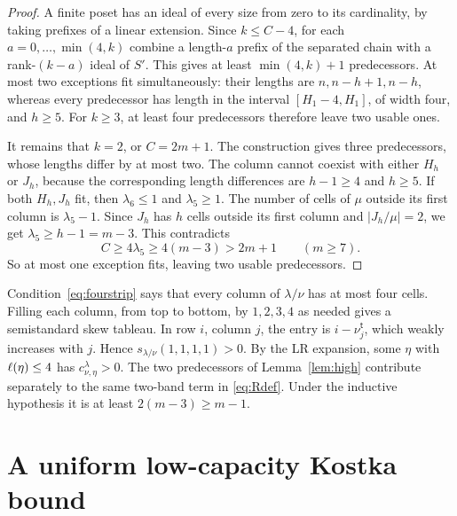 \documentclass[11pt]{article}
\theoremstyle{remark}\newtheorem{remark}[theorem]{Remark}
\newcommand{\trp}{\mathsf t}\newcommand{\eps}{\varepsilon}
\numberwithin{equation}{section}\setlength{\emergencystretch}{2em}
\begin{document}
\begin{proof}
A finite poset has an ideal of every size from zero to its cardinality,
by taking prefixes of a linear extension. Since $k\le C-4$, for each
$a=0,\ldots,\min(4,k)$ combine a length-$a$ prefix of the separated
chain with a rank-$(k-a)$ ideal of $S'$. This gives at least
$\min(4,k)+1$ predecessors. At most two exceptions fit simultaneously:
their lengths are $n,n-h+1,n-h$, whereas every predecessor has length
in the interval $[H_1-4,H_1]$, of width four, and $h\ge5$.
For $k\ge3$, at least four predecessors therefore leave two usable ones.

It remains that $k=2$, or $C=2m+1$. The construction gives three
predecessors, whose lengths differ by at most two. The column cannot
coexist with either $H_h$ or $J_h$, because the corresponding length
differences are $h-1\ge4$ and $h\ge5$. If both $H_h,J_h$ fit, then
$\lambda_6\le1$ and $\lambda_5\ge1$. The number of cells of $\mu$
outside its first column is $\lambda_5-1$. Since $J_h$ has $h$ cells
outside its first column and $|J_h/\mu|=2$, we get
$\lambda_5\ge h-1=m-3$. This contradicts
\[
 C\ge4\lambda_5\ge4(m-3)>2m+1\qquad(m\ge7).
\]
So at most one exception fits, leaving two usable predecessors.
\end{proof}

Condition~\eqref{eq:fourstrip} says that every column of $\lambda/\nu$
has at most four cells. Filling each column, from top to bottom, by
$1,2,3,4$ as needed gives a semistandard skew tableau. In row $i$,
column $j$, the entry is $i-\nu^{\trp}_j$, which weakly increases
with $j$. Hence $s_{\lambda/\nu}(1,1,1,1)>0$. By the LR expansion,
some $\eta$ with $\ell(\eta)\le4$ has $c_{\nu,\eta}^{\lambda}>0$.
The two predecessors of Lemma~\ref{lem:high} contribute separately to
the same two-band term in \eqref{eq:Rdef}. Under the inductive hypothesis
it is at least $2(m-3)\ge m-1$.

\section{A uniform low-capacity Kostka bound}\label{sec:low}
\end{document}
